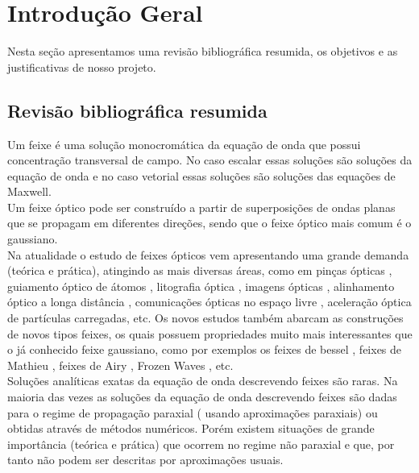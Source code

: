 \chapter{Introdução Geral}
Nesta seção apresentamos  uma revisão bibliográfica resumida, os objetivos e as justificativas  de nosso projeto.
\section{Revisão bibliográfica resumida}
Um feixe é uma solução monocromática da equação de onda que possui concentração transversal de campo. No caso escalar essas soluções são soluções da equação de onda e no caso vetorial essas soluções são soluções das equações de Maxwell.\\
Um feixe óptico pode ser construído a partir de superposições de ondas planas que se propagam em diferentes direções, sendo que o feixe óptico mais comum é o gaussiano.\\
Na atualidade o estudo de feixes ópticos vem apresentando uma grande demanda (teórica e prática), atingindo as mais diversas áreas, como em pinças ópticas \cite{Lya:38}\cite{Lya:39}\cite{Lya:40}, guiamento óptico de átomos \cite{Lya:41}\cite{Lya:42}, litografia óptica \cite{Lya:38}, imagens ópticas \cite{Lya:43}, alinhamento óptico a longa distância \cite{Lya:44}, comunicações ópticas no espaço livre \cite{Lya:45}, aceleração óptica de partículas carregadas, etc. Os novos estudos também abarcam as construções de novos tipos feixes, os quais possuem propriedades muito mais interessantes que o já conhecido feixe gaussiano, como por exemplos os feixes de bessel \cite{Lya:6}\cite{Lya:29}, feixes de Mathieu \cite{Lya:49}, feixes de Airy \cite{Lya:50}, Frozen Waves \cite{Lya:46}\cite{Lya:47}\cite{Lya:48}, etc.\\
Soluções analíticas exatas da equação de onda descrevendo feixes são raras. Na maioria das vezes as soluções da equação de onda descrevendo feixes são dadas para o regime de propagação paraxial ( usando aproximações paraxiais)\cite{Lya:3}\cite{Lya:5}\cite{Lya:12}\cite{Lya:26}\cite{Lya:4} ou obtidas através de métodos numéricos. Porém existem situações de grande importância (teórica e prática) que ocorrem no regime não paraxial e que, por tanto não podem ser descritas por aproximações usuais.\\
